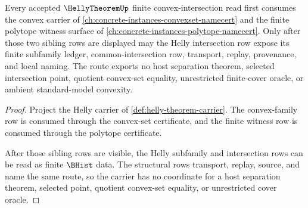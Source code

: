 \begin{theorem}\label{thm:helly-convex-set-dependency-route}
Every accepted $\HellyTheoremUp$ finite convex-intersection read first consumes the convex carrier of \autoref{ch:concrete-instances-convexset-namecert} and the finite polytope witness surface of \autoref{ch:concrete-instances-polytope-namecert}. Only after those two sibling rows are displayed may the Helly intersection row expose its finite subfamily ledger, common-intersection row, transport, replay, provenance, and local naming. The route exports no host separation theorem, selected intersection point, quotient convex-set equality, unrestricted finite-cover oracle, or ambient standard-model convexity.
\end{theorem}
\begin{proof}
Project the Helly carrier of \autoref{def:helly-theorem-carrier}. The convex-family row is consumed through the convex-set certificate, and the finite witness row is consumed through the polytope certificate.

After those sibling rows are visible, the Helly subfamily and intersection rows can be read as finite $\BHist$ data. The structural rows transport, replay, source, and name the same route, so the carrier has no coordinate for a host separation theorem, selected point, quotient convex-set equality, or unrestricted cover oracle.
\end{proof}
